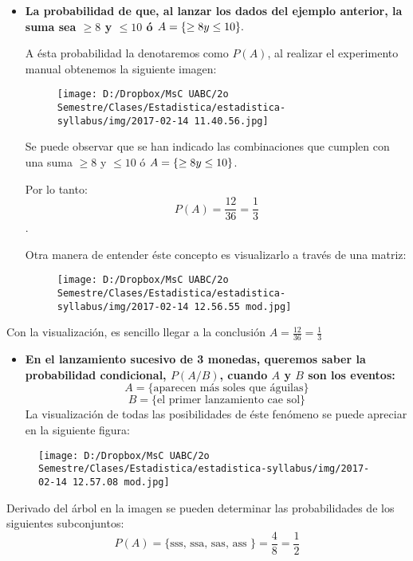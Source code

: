 \documentclass[]{book}
\providecommand{\tightlist}{%
  \setlength{\itemsep}{0pt}\setlength{\parskip}{0pt}}
\begin{document}
\begin{itemize}
\item
  \textbf{La probabilidad de que, al lanzar los dados del ejemplo
  anterior, la suma sea \(\geq 8\) y \(\leq 10\) ó
  \(A = \{\geq 8 \space y \space \leq 10\}.\)}

  A ésta probabilidad la denotaremos como \(P(A)\), al realizar el
  experimento manual obtenemos la siguiente imagen:

  \begin{figure}[htbp]
  \centering
  \texttt{[image: D:/Dropbox/MsC UABC/2o Semestre/Clases/Estadistica/estadistica-syllabus/img/2017-02-14 11.40.56.jpg]}
  \caption{}
  \end{figure}

   Se puede observar que se han indicado las combinaciones que cumplen
  con una suma \(\geq 8\) y \(\leq 10\) ó
  \(A = \{\geq 8 \space y \space \leq 10\}\).

  Por lo tanto: \[P(A) = \frac {12}{36} = \frac {1}{3}\].

  Otra manera de entender éste concepto es visualizarlo a través de una
  matriz:

  \begin{figure}[htbp]
  \centering
  \texttt{[image: D:/Dropbox/MsC UABC/2o Semestre/Clases/Estadistica/estadistica-syllabus/img/2017-02-14 12.56.55 mod.jpg]}
  \caption{}
  \end{figure}
\end{itemize}

Con la visualización, es sencillo llegar a la conclusión
\(A = \frac {12}{36} = \frac {1}{3}\)

\begin{itemize}
\tightlist
\item
  \textbf{En el lanzamiento sucesivo de 3 monedas, queremos saber la
  probabilidad condicional, \(P(A/B)\), cuando \(A\) y \(B\) son los
  eventos:} \[A = \{\text{aparecen más soles que águilas}\}\]
  \[B = \{\text{el primer lanzamiento cae sol}\}\] La visualización de
  todas las posibilidades de éste fenómeno se puede apreciar en la
  siguiente figura:
\end{itemize}

\begin{figure}[htbp]
\centering
\texttt{[image: D:/Dropbox/MsC UABC/2o Semestre/Clases/Estadistica/estadistica-syllabus/img/2017-02-14 12.57.08 mod.jpg]}
\caption{}
\end{figure}

Derivado del árbol en la imagen se pueden determinar las probabilidades
de los siguientes subconjuntos:
\[P(A) = \{\text{sss, ssa, sas, ass }\} = \frac {4}{8} = \frac {1}{2}\]
\end{document}
